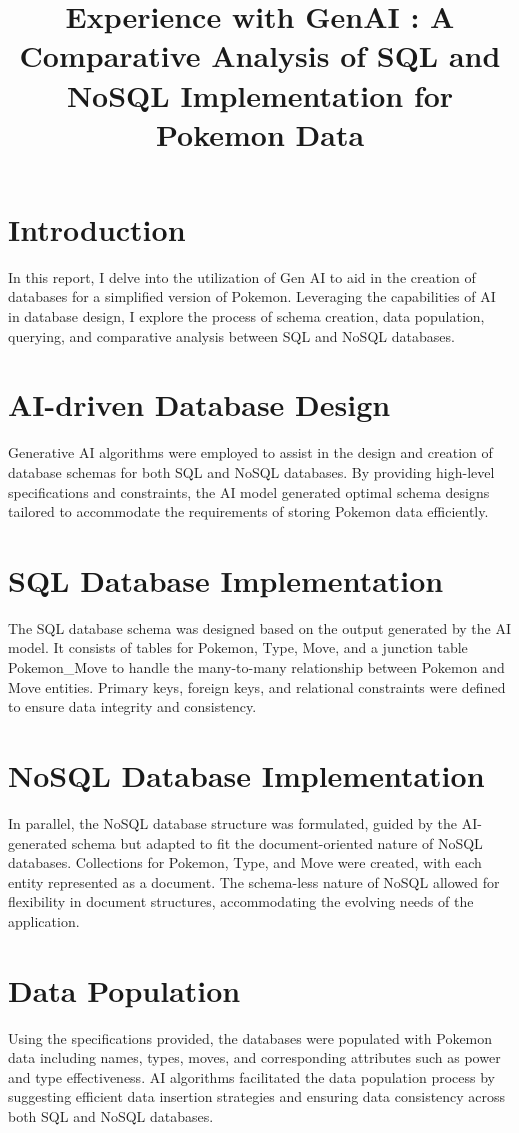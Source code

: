 \documentclass{article}
\title{Experience with GenAI : A Comparative Analysis of SQL and NoSQL Implementation for Pokemon Data}
\author{}
\date{}
\begin{document}
\maketitle

\section{Introduction}
In this report, I delve into the utilization of Gen AI to aid in the creation of databases for a simplified version of Pokemon. Leveraging the capabilities of AI in database design, I explore the process of schema creation, data population, querying, and comparative analysis between SQL and NoSQL databases.

\section{AI-driven Database Design}
Generative AI algorithms were employed to assist in the design and creation of database schemas for both SQL and NoSQL databases. By providing high-level specifications and constraints, the AI model generated optimal schema designs tailored to accommodate the requirements of storing Pokemon data efficiently.

\section{SQL Database Implementation}
The SQL database schema was designed based on the output generated by the AI model. It consists of tables for Pokemon, Type, Move, and a junction table Pokemon\_Move to handle the many-to-many relationship between Pokemon and Move entities. Primary keys, foreign keys, and relational constraints were defined to ensure data integrity and consistency.

\section{NoSQL Database Implementation}
In parallel, the NoSQL database structure was formulated, guided by the AI-generated schema but adapted to fit the document-oriented nature of NoSQL databases. Collections for Pokemon, Type, and Move were created, with each entity represented as a document. The schema-less nature of NoSQL allowed for flexibility in document structures, accommodating the evolving needs of the application.

\section{Data Population}
Using the specifications provided, the databases were populated with Pokemon data including names, types, moves, and corresponding attributes such as power and type effectiveness. AI algorithms facilitated the data population process by suggesting efficient data insertion strategies and ensuring data consistency across both SQL and NoSQL databases.
\end{document}

